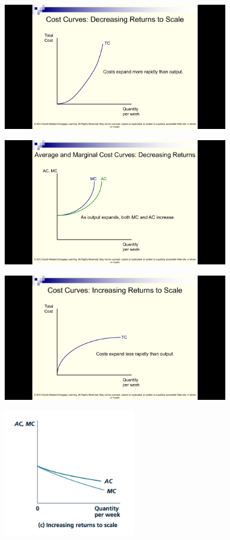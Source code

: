 \documentclass[]{article}
\begin{document}
\includegraphics[height=2.2in]{picsfigs/drsTCcurve.png}

\includegraphics[height=2.2in]{picsfigs/drscostcurves}

\includegraphics[height=2.2in]{picsfigs/irsTCcurve.png}

\includegraphics[height=2.2in]{picsfigs/irscosts_fix.png}
\end{document}
